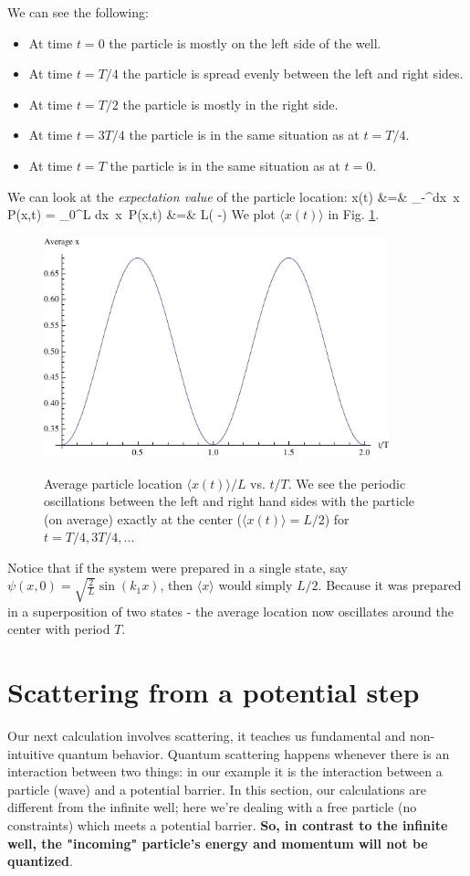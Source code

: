 \documentclass{Textbook}
\begin{document}
We can see the following:
\begin{itemize}
\item At time $t=0$ the particle is mostly on the left side of the well.
\item At time $t=T/4$ the particle is spread evenly between the left and right sides.
\item At time $t=T/2$ the particle is mostly in the right side.
\item At time $t=3T/4$ the particle is in the same situation as at $t=T/4$.
\item At time $t=T$ the particle is in the same situation as at $t=0$.
\end{itemize}
We can look at the \emph{expectation value} of the particle location:
\bea
\langle x(t) \rangle &=& \int_{-\infty}^\infty dx\, x\, P(x,t) = \int_0^L dx\, x\, P(x,t) \nn
           &=& L\left( -\right)
\eea
We plot $\langle x(t) \rangle$ in Fig. \ref{fig:av_x_infinite_square_well}.
\begin{figure}[!ht]
  \centering
  \includegraphics[width=10cm]{av_x_infinite_square_well.pdf}\\
  \caption{Average particle location $\langle x(t) \rangle / L$ vs. $t/T$. We see the periodic oscillations between the left and right hand sides with the particle (on average) exactly at the center ($\langle x(t) \rangle=L/2$) for $t=T/4, 3T/4,...$}
  \label{fig:av_x_infinite_square_well}
\end{figure}

\vspace{0.5cm}
\noindent Notice that if the system were prepared in a single state, say $\psi(x,0) = \sqrt{\frac{2}{L}}\sin(k_1 x)$, then $\langle x \rangle$ would simply $L/2$. Because it was prepared in a superposition of two states - the average location now oscillates around the center with period $T$.
\newpage
\section{Scattering from a potential step}
Our next calculation involves scattering, it teaches us fundamental and non-intuitive quantum behavior. Quantum scattering happens whenever there is an interaction between two things: in our example it is the interaction between a particle (wave) and a potential barrier. In this section, our calculations are different from the infinite well; here we're dealing with a free particle (no constraints) which meets a potential barrier. \textbf{So, in contrast to the infinite well, the "incoming" particle's energy and momentum will not be quantized}. 
\end{document}

